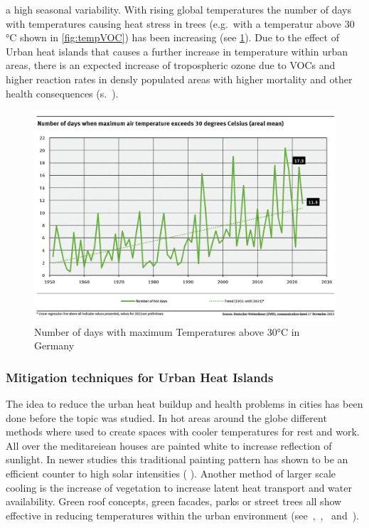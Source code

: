 \documentclass[12pt,a4paper, english]{article}
\begin{document}
a high seasonal variability. 
With rising global temperatures the number of days with temperatures causing heat stress in trees (e.g.\ with a temperatur above 30 °C shown in \cref{fig:tempVOC}) has been increasing (see \cref{fig:ubaTemp}).%
Due to the effect of Urban heat islands that causes a further increase in temperature within urban areas,  there is an expected increase of tropospheric ozone due to \glspl{VOC} and higher reaction rates in densly populated areas with higher mortality and other health consequences (s.~\cite{Ebi2008}).\\
\begin{figure}[!htbp]
  \begin{center}
    \includegraphics[width=\textwidth]{img/ubaTemp}
    \caption{Number of days with maximum Temperatures above 30°C in Germany~\cite{uba}\label{fig:ubaTemp}}
  \end{center}
\end{figure}

\subsubsection{Mitigation techniques for Urban Heat Islands}
The idea to reduce the urban heat buildup and health problems in cities has been done before the topic was studied. 
In hot areas around the globe different methods where used to create spaces with cooler temperatures for rest and work. 
All over the meditareiean houses are painted white to increase reflection of sunlight. 
In newer studies this traditional painting pattern has shown to be an efficient counter to high solar intensities ( \cite{Fayad2021}).
Another method of larger scale cooling is the increase of vegetation to increase latent heat transport and water availability.
Green roof concepts, green facades, parks or street trees all show effective in reducing temperatures within the urban environment (see~\cite{Ramamurthy2014},~\cite{Feyisa2014},~\cite{Dimoudi2003} and~\cite{Gartland2008}).
\end{document}
